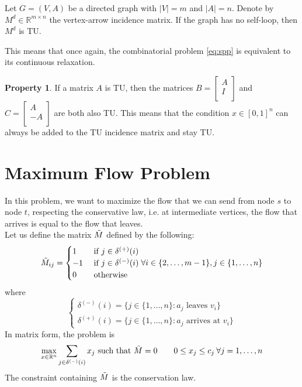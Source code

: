 \documentclass[11pt, openany]{report}
\newcommand{\R}{\mathbb{R}}
\theoremstyle{definition}
\newtheorem{prop}[thm]{Property}
\begin{document}
\begin{tcolorbox}[breakable,
    colback=white,
    colframe=white!75!black,
    title={Theorem}]
    Let \(G=(V,A)\) be a directed graph with \(|V|=m\) and \(|A|=n\). Denote by \(M^d\in\R^{m\times n}\) the vertex-arrow incidence matrix. If the graph has no self-loop, then \(M^d\) is TU.
\end{tcolorbox}
This means that once again, the combinatorial problem \eqref{eq:spp} is equivalent to its continuous relaxation. 
\begin{prop}
    If a matrix \(A\) is TU, then the matrices \(B=\begin{bmatrix}
        A \\
        I \\
    \end{bmatrix}\) and \(C=\begin{bmatrix}
        A\\ -A\\
    \end{bmatrix}\) are both also TU. This means that the condition \(x\in [0,1]^n\) can always be added to the TU incidence matrix and stay TU.
\end{prop}
\section{Maximum Flow Problem}
In this problem, we want to maximize the flow that we can send from node \(s\) to node \(t\), respecting the conservative law, i.e. at intermediate vertices, the flow that arrives is equal to the flow that leaves. \\
Let us define the matrix \(\Tilde M\) defined by the following:
\begin{equation}
    \Tilde M_{ij} = \begin{cases}
        1 & \text{ if } j\in \delta^{(+)}(i)\\
        -1 & \text{ if } j\in \delta^{(-)}(i)\\
        0 & \text{ otherwise}\\
    \end{cases} \forall i\in \{2,\dots,m-1\},j\in \{1,\dots, n\}
\end{equation}
where 
\begin{equation}
    \begin{cases}
        \delta^{(-)}(i) = \{j\in \{1,\dots,n\}:a_j\text{ leaves }v_i\}\\
        \delta^{(+)}(i) = \{j\in \{1,\dots,n\}:a_j\text{ arrives at }v_i\}
    \end{cases}
\end{equation}
In matrix form, the problem is
\begin{equation}
    \max_{x\in \R^n} \sum_{j\in \delta^{(-)}(i)}x_j \text{   such that   } \Tilde M=0\qquad 0\le x_j\le c_j \: \forall j=1,\dots,n
\end{equation}
The constraint containing \(\Tilde M\) is the conservation law. 
\end{document}
